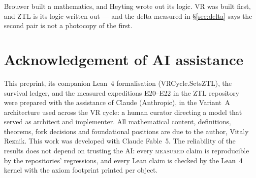 \documentclass[11pt]{article}
\theoremstyle{remark}
\newcommand{\MEASURED}{\textsc{measured}}
\begin{document}
Brouwer built a mathematics, and Heyting wrote out its logic. VR was built
first, and ZTL is its logic written out --- and the delta measured in
\S\ref{sec:delta} says the second pair is not a photocopy of the first.

\section*{Acknowledgement of AI assistance}
This preprint, its companion Lean~4 formalisation
(\textsf{VRCycle.SetsZTL}), the survival ledger, and the measured
expeditions E20--E22 in the ZTL repository were prepared with the
assistance of Claude (Anthropic), in the Variant~A architecture used across
the VR cycle: a human curator directing a model that served as architect
and implementer. All mathematical content, definitions, theorems, fork
decisions and foundational positions are due to the author, Vitaly Reznik.
This work was developed with Claude Fable~5. The reliability of the results
does not depend on trusting the AI: every \MEASURED{} claim is reproducible
by the repositories' regressions, and every Lean claim is checked by the
Lean~4 kernel with the axiom footprint printed per object.
\end{document}
